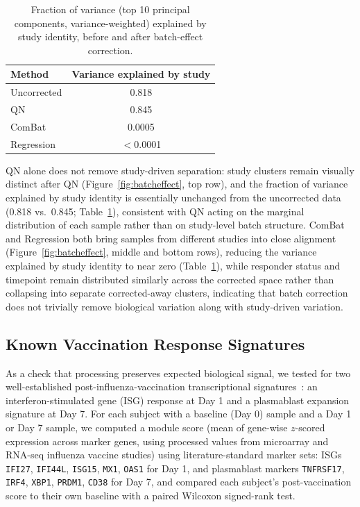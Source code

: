\documentclass[
  12pt]{article}
\begin{document}
\begin{table}[ht]
\centering
\caption{Fraction of variance (top 10 principal components, variance-weighted) explained by study identity, before and after batch-effect correction.}
\begin{tabular}{lc}
\hline
\textbf{Method} & \textbf{Variance explained by study} \\
\hline
Uncorrected & 0.818 \\
QN & 0.845 \\
ComBat & 0.0005 \\
Regression & $<$0.0001 \\
\hline
\end{tabular}
\label{tab:batch_variance}
\end{table}

QN alone does not remove study-driven separation: study clusters remain visually distinct after QN (Figure~\ref{fig:batcheffect}, top row), and the fraction of variance explained by study identity is essentially unchanged from the uncorrected data (0.818 vs.\ 0.845; Table~\ref{tab:batch_variance}), consistent with QN acting on the marginal distribution of each sample rather than on study-level batch structure. ComBat and Regression both bring samples from different studies into close alignment (Figure~\ref{fig:batcheffect}, middle and bottom rows), reducing the variance explained by study identity to near zero (Table~\ref{tab:batch_variance}), while responder status and timepoint remain distributed similarly across the corrected space rather than collapsing into separate corrected-away clusters, indicating that batch correction does not trivially remove biological variation along with study-driven variation.

\subsection{Known Vaccination Response Signatures}

As a check that processing preserves expected biological signal, we tested for two well-established post-influenza-vaccination transcriptional signatures~\citep{nakaya2011systems,nakaya2015systems}: an interferon-stimulated gene (ISG) response at Day 1 and a plasmablast expansion signature at Day 7. For each subject with a baseline (Day 0) sample and a Day 1 or Day 7 sample, we computed a module score (mean of gene-wise $z$-scored expression across marker genes, using processed values from microarray and RNA-seq influenza vaccine studies) using literature-standard marker sets: ISGs \texttt{IFI27}, \texttt{IFI44L}, \texttt{ISG15}, \texttt{MX1}, \texttt{OAS1} for Day 1, and plasmablast markers \texttt{TNFRSF17}, \texttt{IRF4}, \texttt{XBP1}, \texttt{PRDM1}, \texttt{CD38} for Day 7, and compared each subject's post-vaccination score to their own baseline with a paired Wilcoxon signed-rank test.
\end{document}
